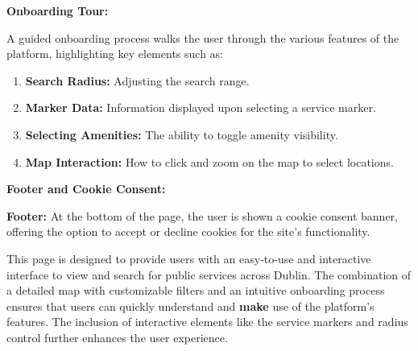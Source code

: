 \textbf{Onboarding Tour:}

A guided onboarding process walks the user through the various features of the platform, highlighting key elements such as:

\begin{enumerate}
    \item{} \textbf{Search Radius:} Adjusting the search range.
    \item{} \textbf{Marker Data:} Information displayed upon selecting a service marker.
    \item{} \textbf{Selecting Amenities:} The ability to toggle amenity visibility.
    \item{} \textbf{Map Interaction:} How  to click and zoom on the map to select locations.
\end{enumerate}

\textbf{Footer and Cookie Consent:}

\textbf{Footer:} At the bottom of the page, the user is shown a cookie consent banner, offering the option to accept or decline cookies for the site’s functionality.

This page is designed to provide users with an easy{-}to{-}use and interactive interface to view and search for public services across Dublin. The combination of a detailed map with customizable filters and an intuitive onboarding process ensures that users can quickly understand and \textbf{make} use of the platform’s features. The inclusion of interactive elements like the service markers and radius control further enhances the user experience.


\paragraph{}